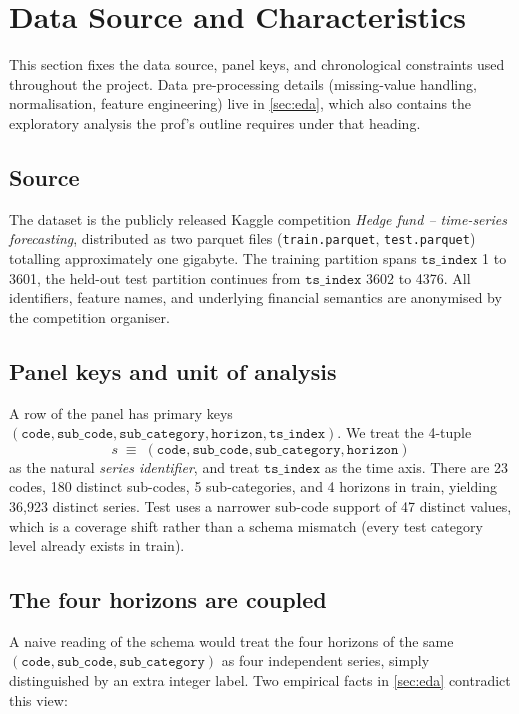 \section{Data Source and Characteristics}
\label{sec:targets}

This section fixes the data source, panel keys, and chronological constraints used throughout the project. Data pre-processing details (missing-value handling, normalisation, feature engineering) live in \cref{sec:eda}, which also contains the exploratory analysis the prof's outline requires under that heading.

\subsection{Source}

The dataset is the publicly released Kaggle competition \emph{Hedge fund -- time-series forecasting}, distributed as two parquet files (\texttt{train.parquet}, \texttt{test.parquet}) totalling approximately one gigabyte. The training partition spans $\mathtt{ts\_index}$ 1 to 3601, the held-out test partition continues from $\mathtt{ts\_index}$ 3602 to 4376. All identifiers, feature names, and underlying financial semantics are anonymised by the competition organiser.

\subsection{Panel keys and unit of analysis}

A row of the panel has primary keys
$(\mathtt{code},\mathtt{sub\_code},\mathtt{sub\_category},\mathtt{horizon},\mathtt{ts\_index})$.
We treat the 4-tuple
\[
s \;\equiv\; (\mathtt{code},\mathtt{sub\_code},\mathtt{sub\_category},\mathtt{horizon})
\]
as the natural \emph{series identifier}, and treat $\mathtt{ts\_index}$ as the time axis. There are 23 codes, 180 distinct sub-codes, 5 sub-categories, and 4 horizons in train, yielding 36{,}923 distinct series. Test uses a narrower sub-code support of 47 distinct values, which is a coverage shift rather than a schema mismatch (every test category level already exists in train).

\subsection{The four horizons are coupled}

A naive reading of the schema would treat the four horizons of the same $(\mathtt{code},\mathtt{sub\_code},\mathtt{sub\_category})$ as four independent series, simply distinguished by an extra integer label. Two empirical facts in \cref{sec:eda} contradict this view:

